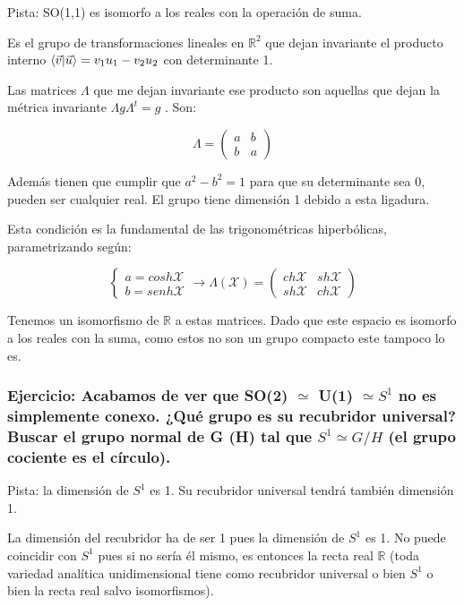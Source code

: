Pista: SO(1,1) es isomorfo a los reales con la operación de suma.


\bigskip
Es el grupo de transformaciones lineales en $\mathds{R}^2$ que dejan invariante el producto interno $\braket{\Vec{v}|\Vec{u}}= v_1u_1 - v_2u_2$ con determinante 1.

\smallskip
Las matrices $\Lambda$ que me dejan invariante ese producto son aquellas que dejan la métrica invariante $\Lambda g \Lambda ^t =g$ . Son:

$$\Lambda = \left (\begin{array}{cc}
a  & b \\
b & a
\end{array} \right)$$

Además tienen que cumplir que $a^2 -b^2=1$ para que su determinante sea 0, pueden ser cualquier real. El grupo tiene dimensión 1 debido a esta ligadura.

Esta condición es la fundamental de las trigonométricas hiperbólicas, parametrizando según:

$$\left \lbrace \begin{array}{cc}
a=cosh \mathcal{X}  \\
b=senh \mathcal{X}
\end{array} \right .  \longrightarrow \Lambda (\mathcal{X})=\left ( \begin{array}{cc}
ch\mathcal{X} & sh\mathcal{X} \\
sh\mathcal{X}   & ch\mathcal{X}
\end{array}\right)$$

Tenemos un isomorfismo de $\mathds{R}$ a estas matrices. Dado que este espacio es isomorfo a los reales con la suma, como estos no son un grupo compacto este tampoco lo es.


\subsubsection{Ejercicio: Acabamos de ver que SO(2) $\simeq$ U(1) $\simeq S^1$  no es simplemente conexo. ¿Qué grupo es su recubridor universal? Buscar el grupo normal de G (H) tal que $S^1 \simeq G/H$ (el grupo cociente es el círculo).}

Pista: la dimensión de $S^1$ es 1. Su recubridor universal tendrá también dimensión 1.


\smallskip
La dimensión del recubridor ha de ser 1 pues la dimensión de $S^1$ es 1. No puede coincidir con $S^1$ pues si no sería él mismo, es entonces la recta real $\mathds{R}$ (toda variedad analítica unidimensional tiene como recubridor universal o bien $S^1$ o bien la recta real salvo isomorfismos).

